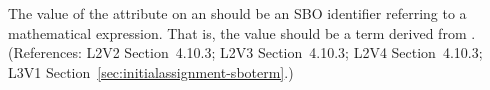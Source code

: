 The value of the  attribute on an \InitialAssignment should be an
SBO identifier referring to a mathematical expression.  That is, the value
should be a term derived from \sbomathformula.  (References: L2V2 Section~4.10.3;
L2V3 Section~4.10.3; L2V4 Section~4.10.3; L3V1 Section~\ref{sec:initialassignment-sboterm}.)
